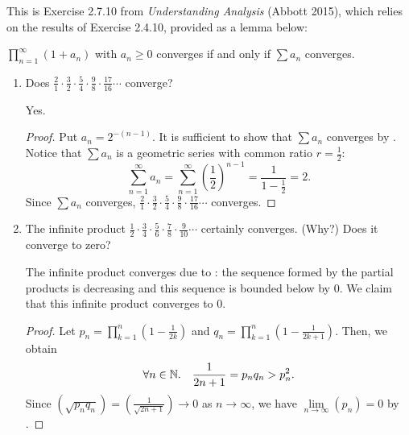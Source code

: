 \begin{problem}
  \leavevmode\par\noindent

  \begin{callout}
    This is Exercise 2.7.10 from \textit{Understanding Analysis} (Abbott 2015), which relies on the results
    of Exercise 2.4.10, provided as a lemma below:

    \begin{lemma}
      \label{lem:2.4.10}
      $\prod_{n=1}^{\infty} (1 + a_{n})$ with $a_{n} \geq 0$ converges if and only if $\sum a_{n}$ converges.
    \end{lemma}

  \end{callout}

  \begin{enumerate}[label=(\alph*)]
    \item Does $\frac{2}{1} \cdot \frac{3}{2} \cdot \frac{5}{4} \cdot \frac{9}{8} \cdot \frac{17}{16} \cdots$ converge?
      \vspace{\baselineskip}

      Yes.

      \begin{proof}
        Put $a_{n} = 2^{-(n-1)}$. It is sufficient to show that $\sum a_{n}$ converges by . 
        Notice that $\sum a_{n}$ is a geometric series with common ratio $r = \frac{1}{2}$:
        \[
          \sum_{n=1}^{\infty} a_{n} = \sum_{n=1}^{\infty} \left( \frac{1}{2} \right)^{n-1} = \frac{1}{1 - \frac{1}{2}} = 2.
        \]
        Since $\sum a_{n}$ converges, $\frac{2}{1} \cdot \frac{3}{2} \cdot \frac{5}{4} \cdot \frac{9}{8} \cdot \frac{17}{16} \cdots$ converges.
      \end{proof}

    \item The infinite product $\frac{1}{2} \cdot \frac{3}{4} \cdot \frac{5}{6} \cdot \frac{7}{8} \cdot \frac{9}{10} \cdots$ certainly converges. (Why?) Does it converge to zero?
      \vspace{\baselineskip}

      The infinite product converges due to :
      the sequence formed by the partial products is decreasing and this
      sequence is bounded below by $0$. We claim that this infinite product converges to $0$.

      \begin{proof}
        Let $p_{n} = \prod_{k=1}^{n} \left(1 - \frac{1}{2k}\right)$ and $q_{n} = \prod_{k=1}^{n} \left(1 - \frac{1}{2k+1}\right)$.
        Then, we obtain
        \[
          \forall n \in \mathbb{N}. \quad \frac{1}{2n + 1} = p_{n}q_{n} > p_{n}^{2}.
        \]
        Since $\left(\sqrt{ p_{n} q_{n} }\right) = \left( \frac{1}{\sqrt{2n + 1}} \right) \to 0$ as $n \to \infty$, we have 
        $\lim\limits_{n \to \infty} (p_{n}) = 0$ by .
      \end{proof}



\end{enumerate}
\end{problem}
